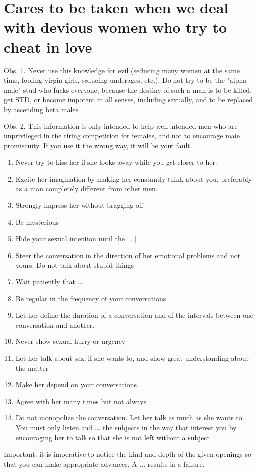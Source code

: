 \section{Cares to be taken when we deal with devious women who try to cheat in love}

\par Obs. 1. Never use this knowledge for evil (seducing many women at the same time, fooling virgin girls, seducing underages, etc.). Do not try to be the "alpha male" stud who fucks everyone, because the destiny of such a man is to be killed, get STD, or become impotent in all senses, including sexually, and to be replaced by ascending beta males

\par Obs. 2. This information is only intended to help well-intended men who are unprivileged in the tiring competition for females, and not to encourage male promiscuity. If you use it the wrong way, it will be your fault.

\begin{enumerate}
  \item Never try to kiss her if she looks away while you get closer to her.
  \item Excite her imagination by making her constantly think about you, preferably as a man completely different from other men.
  \item Strongly impress her without bragging off
  \item Be mysterious
  \item Hide your sexual intention until the [...]
  \item Steer the conversation in the direction of her emotional problems and not yours. Do not talk about stupid things
  \item Wait patiently that ...
  \item Be regular in the frequency of your conversations
  \item Let her define the duration of a conversation and of the intervals between one conversation and another.
  \item Never show sexual hurry or urgency
  \item Let her talk about sex, if she wants to, and show great understanding about the matter
  \item Make her depend on your conversations.
  \item Agree with her many times but not always
  \item Do not monopolize the conversation. Let her talk as much as she wants to. You must only listen and ... the subjects in the way that interest you by encouraging her to talk so that she is not left without a subject
\end{enumerate}

\par Important: it is imperative to notice the kind and depth of the given openings so that you can make appropriate advances. A ... results in a failure.
